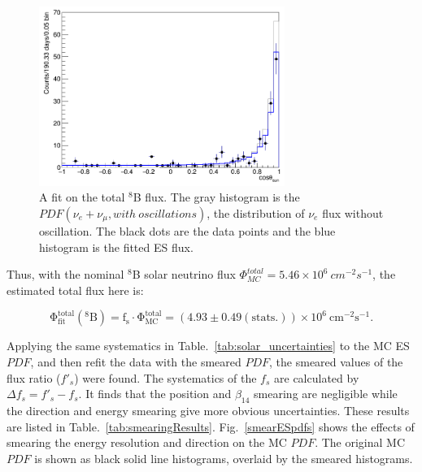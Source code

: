 \begin{figure}[!htb]
	\centering
	\includegraphics[width=8cm]{TOTALfluxFit.png}
	\caption[A fit on the total $^8$B flux.]{A fit on the total $^8$B flux. The gray histogram is the $PDF(\nu_e+\nu_\mu,with~oscillations)$, the distribution of $\nu_e$ flux without oscillation. The black dots are the data points and the blue histogram is the fitted ES flux.}
	\label{fig:TOTALfluxFit}
\end{figure}

Thus, with the nominal $^8$B solar neutrino flux $\Phi^{total}_{MC}=5.46\times 10^6~cm^{-2}s^{-1}$, the estimated total flux here is:

\begin{equation}
\mathrm{\Phi^{total}_{fit}(^8 B)=f_s\cdot \Phi^{total}_{MC}=(
 4.93 \pm 0.49(stats.))\times 10^6~cm^{-2}s^{-1}}.
\end{equation}

Applying the same systematics in Table.~\ref{tab:solar_uncertainties} to the MC ES $PDF$, and then refit the data with the smeared $PDF$, the smeared values of the flux ratio ($f'_s$) were found. The systematics of the $f_s$ are calculated by $\Delta f_s =f'_s-f_s$. It finds that the position and $\beta_{14}$ smearing are negligible while the direction and energy smearing give more obvious uncertainties. These results are listed in Table.~\ref{tab:smearingResults}. Fig.~\ref{smearESpdfs} shows the effects of smearing the energy resolution and direction on the MC $PDF$. The original MC $PDF$ is shown as black solid line histograms, overlaid by the smeared histograms. 

